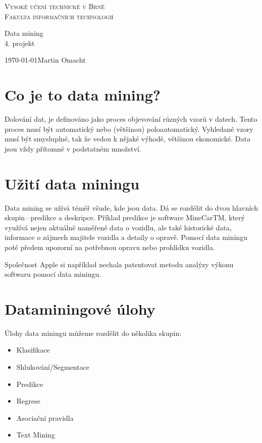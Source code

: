 \documentclass[12pt,a4paper]{article}
\begin{document}
	\begin{titlepage}
		\begin{center}
			\Huge
			\textsc{Vysoké učení technické v Brně\\[-2mm]
				\huge Fakulta informačních technologií}
			
			
			\LARGE
			{\huge Data mining }\\4. projekt
		\end{center}
		{\Large \today \hfill Martin Omacht}
	\end{titlepage}
	
	\section{Co je to data mining?}
	Dolování dat, je definováno jako proces objevování různých vzorů v datech. Tento proces musí být automatický nebo (většinou) poloautomatický. Vyhledané vzory musí být smysluplné, tak že vedou k nějaké výhodě, většinou ekonomické. Data jsou vždy přítomné v podstatném množství. \cite{7025:DataMining}
	
	\section{Užití data miningu}
	\begin{quote}
		\emph{} \cite{9813:DataMining}
	\end{quote}
	Data mining se užívá téměř všude, kde jsou data. Dá se rozdělit do dvou hlavních skupin\,--\,predikce a deskripce. \cite{Online:PredikceDeskripce} Příklad predikce je software MineCarTM, který využívá nejen aktuálně naměřené data o vozidlu, ale také historické data, informace o zájmech majitele vozidla a detaily o opravě. Pomocí data miningu poté předem upozorní na potřebnou opravu nebo prohlídku vozidla. \cite{Article:VehiclePerformance}
	
	Společnost Apple si například nechala patentovat metodu analýzy výkonu softwaru pomocí data miningu. \cite{Article:ApplePatent}
	
	\section{Dataminingové úlohy}
	Úlohy data miningu můžeme rozdělit do několika skupin:
	\begin{itemize}
		\item Klasifikace
		\item Shlukování/Segmentace
		\item Predikce
		\item Regrese
		\item Asociační pravidla
		\item Text Mining \cite{Online:UvodDoDataMiningu}
	\end{itemize}
	
\end{document}
